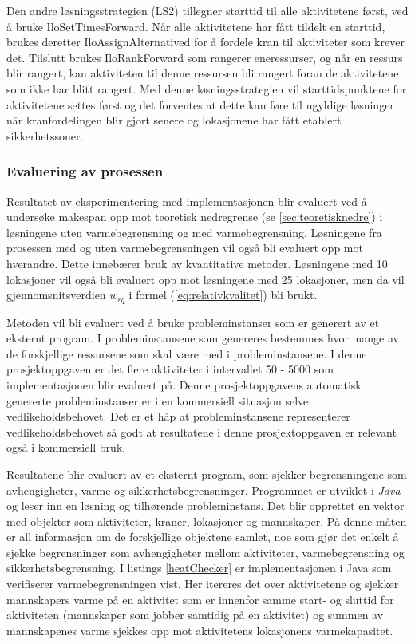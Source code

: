 Den andre løsningsstrategien (LS2) tillegner starttid til alle aktivitetene først, ved å bruke IloSetTimesForward. Når alle aktivitetene har fått tildelt en starttid, brukes deretter IloAssignAlternatived for å fordele kran til aktiviteter som krever det. Tilslutt brukes IloRankForward som rangerer eneressurser, og når en ressurs blir rangert, kan aktiviteten til denne ressursen bli rangert foran de aktivitetene som ikke har blitt rangert. Med denne løsningsstrategien vil starttidspunktene for aktivitetene settes først og det forventes at dette kan føre til ugyldige løsninger når kranfordelingen blir gjort senere og lokasjonene har fått etablert sikkerhetssoner.

\subsubsection{Evaluering av prosessen}
Resultatet av eksperimentering med implementasjonen blir evaluert ved å undersøke makespan opp mot teoretisk nedregrense (se \ref{sec:teoretisknedre}) i løsningene uten varmebegrensning og med varmebegrensning. Løsningene fra prosessen med og uten varmebegrensningen vil også bli evaluert opp mot hverandre. Dette innebærer bruk av kvantitative metoder. Løsningene med 10 lokasjoner vil også bli evaluert opp mot løsningene med 25 lokasjoner, men da vil gjennomsnitsverdien $w_{rq}$ i formel (\ref{eq:relativkvalitet}) bli brukt.

Metoden vil bli evaluert ved å bruke probleminstanser som er generert av et eksternt program. I probleminstansene som genereres bestemmes hvor mange av de forskjellige ressursene som skal være med i probleminstansene. I denne prosjektoppgaven er det flere aktiviteter i intervallet 50 - 5000 som implementasjonen blir evaluert på. Denne prosjektoppgavens automatisk genererte probleminstanser er i en kommersiell situasjon selve vedlikeholdsbehovet. Det er et håp at probleminstansene representerer vedlikeholdsbehovet så godt at resultatene i denne prosjektoppgaven er relevant også i kommersiell bruk.

Resultatene blir evaluert av et eksternt program, som sjekker begrensningene som avhengigheter, varme og sikkerhetsbegrensninger. Programmet er utviklet i \textit{Java} og leser inn en løsning og tilhørende probleminstans. Det blir opprettet en vektor med objekter som aktiviteter, kraner, lokasjoner og mannskaper. På denne måten er all informasjon om de forskjellige objektene samlet, noe som gjør det enkelt å sjekke begrensninger som avhengigheter mellom aktiviteter, varmebegrensning og sikkerhetsbegrensning. I listings \ref{heatChecker} er implementasjonen i Java som verifiserer varmebegrensningen vist. Her itereres det over aktivitetene og sjekker mannskapers varme på en aktivitet som er innenfor samme start- og sluttid for aktiviteten (mannskaper som jobber samtidig på en aktivitet) og summen av mannskapenes varme sjekkes opp mot aktivitetens lokasjonens varmekapasitet.

